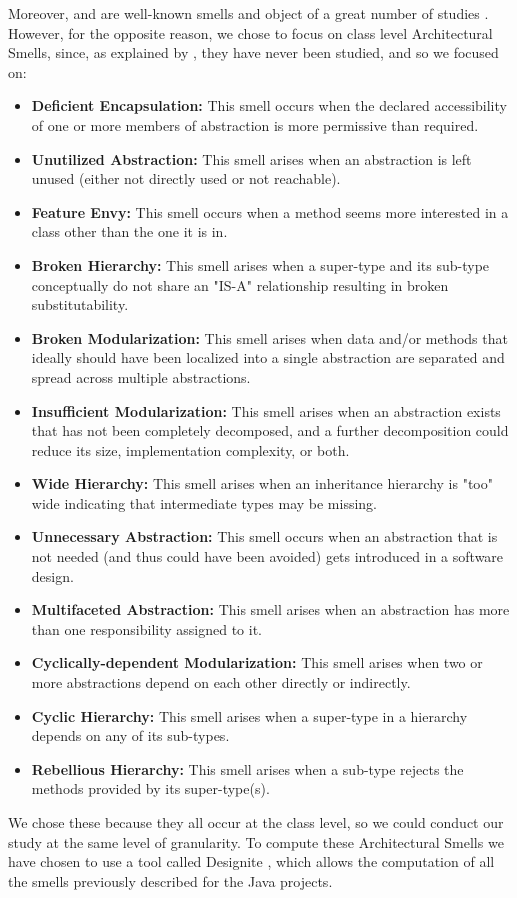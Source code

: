 Moreover, \cyclic and \hublike are well-known smells and object of a great number of studies \cite{IEEEhowto:systematicmapping}. 
However, for the opposite reason, we chose to focus on class level Architectural Smells, since, as explained by \cite{IEEEhowto:systematicmapping}, they have never been studied, and so we focused on:
\begin{itemize}
  \item \textbf{Deficient Encapsulation:} This smell occurs when the declared accessibility of one or more members of abstraction is more permissive than required.
  \item \textbf{Unutilized Abstraction:} This smell arises when an abstraction is left unused (either not directly used or not reachable).
  \item \textbf{Feature Envy:} This smell occurs when a method seems more interested in a class other than the one it is in.
  \item \textbf{Broken Hierarchy:} This smell arises when a super-type and its sub-type conceptually do not share an "IS-A" relationship resulting in broken substitutability.
  \item \textbf{Broken Modularization:} This smell arises when data and/or methods that ideally should have been localized into a single abstraction are separated and spread across multiple abstractions.
  \item \textbf{Insufficient Modularization:} This smell arises when an abstraction exists that has not been completely decomposed, and a further decomposition could reduce its size, implementation complexity, or both.
  \item \textbf{Wide Hierarchy:} This smell arises when an inheritance hierarchy is "too" wide indicating that intermediate types may be missing.
  \item \textbf{Unnecessary Abstraction:} This smell occurs when an abstraction that is not needed (and thus could have been avoided) gets introduced in a software design.
  \item \textbf{Multifaceted Abstraction:} This smell arises when an abstraction has more than one responsibility assigned to it.
  \item \textbf{Cyclically-dependent Modularization:} This smell arises when two or more abstractions depend on each other directly or indirectly.
  \item \textbf{Cyclic Hierarchy:} This smell arises when a super-type in a hierarchy depends on any of its sub-types.
  \item \textbf{Rebellious Hierarchy:} This smell arises when a sub-type rejects the methods provided by its super-type(s).
\end{itemize}
We chose these because they all occur at the class level, so we could conduct our study at the same level of granularity.
To compute these Architectural Smells we have chosen to use a tool called Designite \cite{IEEEhowto:designite}, which allows the computation of all the smells previously described for the Java projects.\par\hfill

